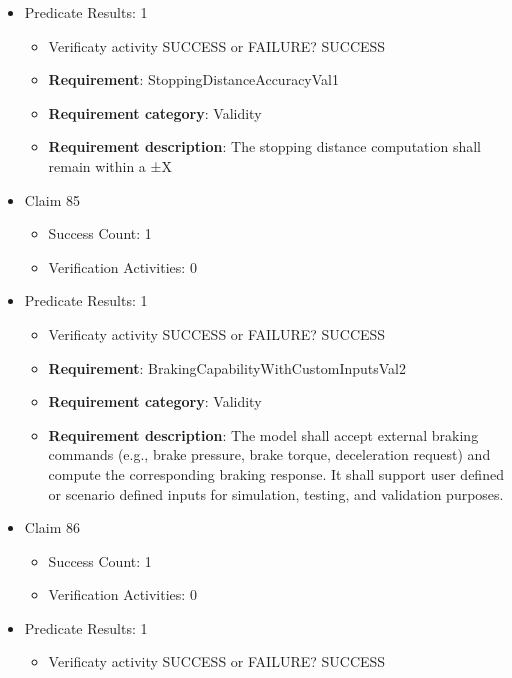 \documentclass{article}
\begin{document}
\begin{itemize}
									    
				\item Predicate Results: 1
					\begin{itemize}				
					\item Verificaty activity SUCCESS or FAILURE? SUCCESS
					
					\item \textbf{Requirement}: StoppingDistanceAccuracyVal1 
					\item \textbf{Requirement category}: Validity
					\item \textbf{Requirement description}: The stopping distance computation shall remain within a ±X%
					\end{itemize}

  				  \item Claim 85
				\begin{itemize}
			    	\item Success Count: 1 
			    	\item Verification Activities: 0
				\end{itemize}
				
									    
				\item Predicate Results: 1
					\begin{itemize}				
					\item Verificaty activity SUCCESS or FAILURE? SUCCESS
					
					\item \textbf{Requirement}: BrakingCapabilityWithCustomInputsVal2 
					\item \textbf{Requirement category}: Validity
					\item \textbf{Requirement description}: The model shall accept external braking commands (e.g., brake pressure, brake torque, deceleration request) and compute the corresponding braking response. It shall support user defined or scenario defined inputs for simulation, testing, and validation purposes.
					\end{itemize}

  				  \item Claim 86
				\begin{itemize}
			    	\item Success Count: 1 
			    	\item Verification Activities: 0
				\end{itemize}
				
									    
				\item Predicate Results: 1
					\begin{itemize}				
					\item Verificaty activity SUCCESS or FAILURE? SUCCESS
					

\end{itemize}
\end{itemize}
\end{document}
